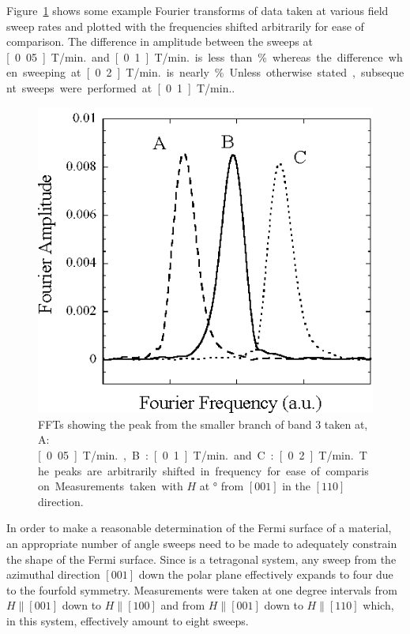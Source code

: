 Figure~\ref{Fig:ResD:ComparisonSweepRates} shows some example Fourier transforms of data taken at various field sweep rates and plotted with the frequencies shifted arbitrarily for ease of comparison. The difference in amplitude between the sweeps at \unit[0.05]{T/min.} and \unit[0.1]{T/min.} is less than \unit[1]{\%} whereas the difference when sweeping at \unit[0.2]{T/min.} is nearly \unit[5]{\%}. Unless otherwise stated, subsequent sweeps were performed at \unit[0.1]{T/min.}.

\begin{figure}[htbp]
    \begin{center}
        \includegraphics[scale=0.7]{Chapter-dHvABaFe2P2/Figures/AngleDepMeasurements/SweepRateComparison/SweepRateComparison}
        \caption{FFTs showing the peak from the smaller branch of band $3$ taken at, A: \unit[0.05]{T/min.}, B: \unit[0.1]{T/min.} and C: \unit[0.2]{T/min.}. The peaks are arbitrarily shifted in frequency for ease of comparison. Measurements taken with $H$ at \unit[10]{\degree} from $[001]$ in the $[110]$ direction.}
        \label{Fig:ResD:ComparisonSweepRates}
    \end{center}
\end{figure}

In order to make a reasonable determination of the Fermi surface of a material, an appropriate number of angle sweeps need to be made to adequately constrain the shape of the Fermi surface. Since \BaFeP is a tetragonal system, any sweep from the azimuthal direction $[001]$ down the polar plane effectively expands to four due to the fourfold symmetry. Measurements were taken at one degree intervals from $H\parallel[001]$ down to $H\parallel[100]$ and from $H\parallel[001]$ down to $H\parallel[110]$ which, in this system, effectively amount to eight sweeps.


